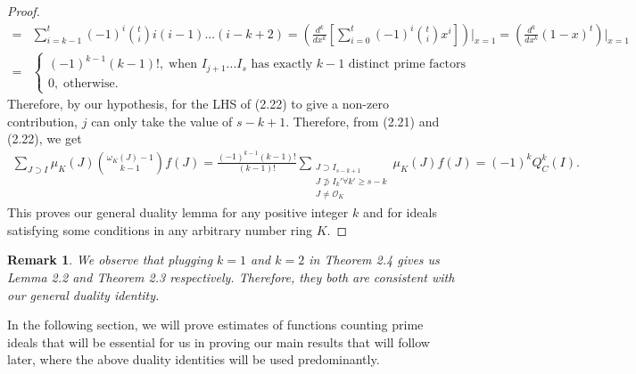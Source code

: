\documentclass[12pt]{article}
\numberwithin{equation}{section}
\newtheorem{remark}[theorem]{Remark}
\numberwithin{equation}{section}
\begin{document}
\begin{proof}
\begin{align}
    =& \sum_{i=k-1}^t (-1)^i {t \choose i}i(i-1)...(i-k+2) = \left(\frac{d^k}{dx^k}\left[\sum_{i=0}^t(-1)^i{t \choose i}x^i\right]\right)\Bigg|_{x=1} = \left(\frac{d^k}{dx^k}(1-x)^t\right)\Bigg|_{x=1} \nonumber \\
    =& \begin{cases}
        (-1)^{k-1}(k-1)!,\;\text{when $I_{j+1}...I_s$ has exactly $k-1$ distinct prime factors} \\
        0,\;\text{otherwise.}
    \end{cases}
\end{align}
Therefore, by our hypothesis, for the LHS of (2.22) to give a non-zero contribution, $j$ can only take the value of $s-k+1$. Therefore, from (2.21) and (2.22), we get 
\begin{align}
     \sum_{J \supset I}\mu_K(J){{\omega_K(J)-1} \choose k-1}f(J) = \frac{(-1)^{k-1}(k-1)!}{(k-1)!} \sum_{\substack{J \supset I_{s-k+1} \\ J \not \supset I_k' \forall k' \geq s-k\\ J \neq \mathcal{O}_K }} \mu_K(J)f(J) = (-1)^kQ_C^k(I).
\end{align}
This proves our general duality lemma for any positive integer $k$ and for ideals satisfying some conditions in any arbitrary number ring $K$. 
\end{proof}

\begin{remark}
    We observe that plugging $k=1$ and $k=2$ in \textit{Theorem 2.4} gives us \textit{Lemma 2.2} and \textit{Theorem 2.3} respectively. Therefore, they both are consistent with our general duality identity.
\end{remark}

\noindent In the following section, we will prove estimates of functions counting prime ideals that will be essential for us in proving our main results that will follow later, where the above duality identities will be used predominantly.
\end{document}
